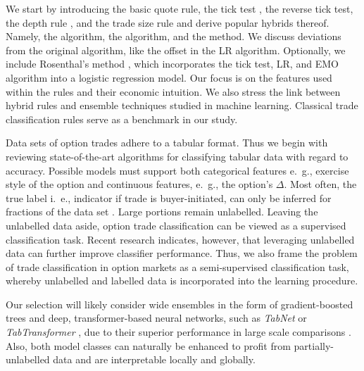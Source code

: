 We start by introducing the basic quote rule, the tick test \autocite{hasbrouckTradesQuotesInventories1988}, the reverse tick test, the depth rule \autocite{grauerOptionTradeClassification2022}, and the trade size rule \autocite{grauerOptionTradeClassification2022} and derive popular hybrids thereof. Namely, the \autocite[LR,][]{leeInferringTradeDirection1991} algorithm, the \autocite[EMO,][]{ellisAccuracyTradeClassification2000} algorithm, and the  \autocite[CLVN,][]{chakrabartyTradeClassificationAlgorithms2007} method. We discuss deviations from the original algorithm, like the offset in the LR algorithm. Optionally, we include Rosenthal's method \autocite{rosenthalModelingTradeDirection2012}, which incorporates the tick test, LR, and EMO algorithm into a logistic regression model. Our focus is on the features used within the rules and their economic intuition. We also stress the link between hybrid rules and ensemble techniques studied in machine learning. Classical trade classification rules serve as a benchmark in our study.

Data sets of option trades adhere to a tabular format.  Thus we begin with reviewing state-of-the-art algorithms for classifying tabular data with regard to accuracy. Possible models must support both categorical features e.~g., exercise style of the option and continuous features, e.~g., the option's $\Delta$. Most often, the true label i.~e., indicator if trade is buyer-initiated, can only be inferred for fractions of the data set \autocites{grauerOptionTradeClassification2022}{savickasInferringDirectionOption2003}. Large portions remain unlabelled. Leaving the unlabelled data aside, option trade classification can be viewed as a supervised classification task. Recent research \autocites{arikTabNetAttentiveInterpretable2020}{huangTabTransformerTabularData2020}{yoonVIMEExtendingSuccess2020} indicates, however, that leveraging unlabelled data can further improve classifier performance. Thus, we also frame the problem of trade classification in option markets as a semi-supervised classification task, whereby unlabelled and labelled data is incorporated into the learning procedure. 

Our selection will likely consider wide ensembles in the form of gradient-boosted trees and deep, transformer-based neural networks, such as \textit{TabNet} \autocite{arikTabNetAttentiveInterpretable2020} or \textit{TabTransformer} \autocite{huangTabTransformerTabularData2020}, due to their superior performance in large scale comparisons \autocites{borisovDeepNeuralNetworks2022}{gorishniyRevisitingDeepLearning2021}{grinsztajnWhyTreebasedModels2022}{shwartz-zivTabularDataDeep2021}. Also, both model classes can naturally be enhanced to profit from partially-unlabelled data and are interpretable locally and globally. 

